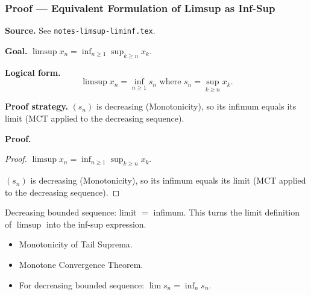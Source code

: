 
\clearpage
{}
\hypertarget{proof-RA-ABB-T-limsup-equiv-infsup}{}

\subsubsection[Equivalent Formulation of Limsup as Inf-Sup]{Proof --- Equivalent Formulation of Limsup as Inf-Sup}

\bigskip

\noindent
\textbf{Source.}
See \texttt{notes-limsup-liminf.tex}.

\vspace{0.75em}

\noindent
\textbf{Goal.}
$\limsup x_n = \inf_{n \ge 1} \sup_{k \ge n} x_k$.

\vspace{0.75em}

\noindent
\textbf{Logical form.}
\[
  \limsup x_n = \inf_{n \ge 1} s_n \text{ where } s_n = \sup_{k \ge n} x_k.
\]

\vspace{0.75em}

\noindent
\textbf{Proof strategy.}
$(s_n)$ is decreasing (Monotonicity), so its infimum equals its limit (MCT applied to the decreasing sequence).

\vspace{0.75em}

\noindent
\textbf{Proof.}
\begin{proof}
\Claim $\limsup x_n = \inf_{n \ge 1} \sup_{k \ge n} x_k$.

\Given 

\Goal 

\Strategy $(s_n)$ is decreasing (Monotonicity), so its infimum equals its limit (MCT applied to the decreasing sequence).

\medskip


\end{proof}

\begin{remark*}
Decreasing bounded sequence: limit $=$ infimum. This turns the limit definition of $\limsup$ into the inf-sup expression.
\end{remark*}

\begin{remark*}[Dependencies]
\begin{itemize}
  \item Monotonicity of Tail Suprema.
  \item Monotone Convergence Theorem.
  \item For decreasing bounded sequence: $\lim s_n = \inf_n s_n$.
\end{itemize}
\end{remark*}
